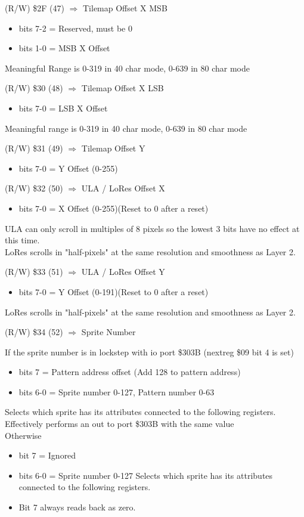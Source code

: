 (R/W) \$2F (47) $\Rightarrow$ Tilemap Offset X MSB
\begin{itemize}
\item[] bits 7-2 = Reserved, must be 0
\item[] bits 1-0 = MSB X Offset
\end{itemize}
Meaningful Range is 0-319 in 40 char mode, 0-639 in 80 char mode

(R/W) \$30 (48) $\Rightarrow$ Tilemap Offset X LSB
\begin{itemize}
\item[] bits 7-0 = LSB X Offset
\end{itemize}
Meaningful range is 0-319 in 40 char mode, 0-639 in 80 char mode

(R/W) \$31 (49) $\Rightarrow$ Tilemap Offset Y
\begin{itemize}
\item[] bits 7-0 = Y Offset (0-255)
\end{itemize}

(R/W) \$32 (50) $\Rightarrow$ ULA / LoRes Offset X
\begin{itemize}
\item[] bits 7-0 = X Offset (0-255)(Reset to 0 after a reset)
\end{itemize}
ULA can only scroll in multiples of 8 pixels so the lowest 3 bits have
no effect at this time.\\
LoRes scrolls in "half-pixels" at the same resolution and smoothness
as Layer 2.

(R/W) \$33 (51) $\Rightarrow$ ULA / LoRes Offset Y
\begin{itemize}
\item[] bits 7-0 = Y Offset (0-191)(Reset to 0 after a reset)
\end{itemize}
LoRes scrolls in "half-pixels" at the same resolution and smoothness
as Layer 2.

(R/W) \$34 (52) $\Rightarrow$ Sprite Number

If the sprite number is in lockstep with io port \$303B (nextreg \$09
bit 4 is set)
\begin{itemize}
\item[] bits 7 = Pattern address offset (Add 128 to pattern address)
\item[] bits 6-0 = Sprite number 0-127, Pattern number 0-63
\end{itemize}
Selects which sprite has its attributes connected to the following
registers.  Effectively performs an out to port \$303B with the same
value\\
Otherwise
\begin{itemize}
\item[] bit 7 = Ignored
\item[] bits 6-0 = Sprite number 0-127
  Selects which sprite has its attributes connected to the following registers.
\item[] Bit 7 always reads back as zero.
\end{itemize}

